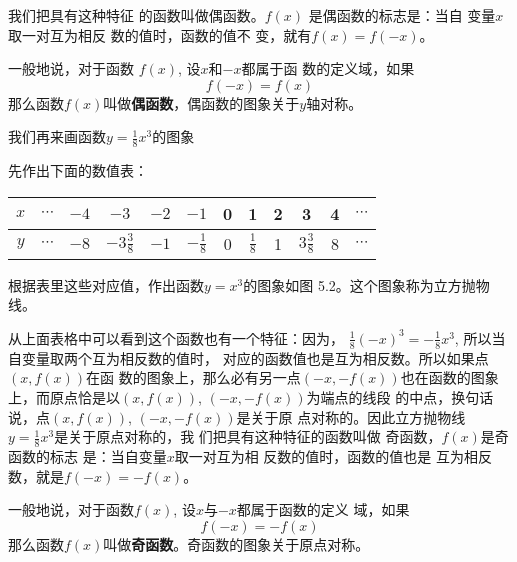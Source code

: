 我们把具有这种特征
的函数叫做偶函数。$f(x)$
是偶函数的标志是：当自
变量$x$取一对互为相反
数的值时，函数的值不
变，就有$f(x)=f(-x)$。

一般地说，对于函数
$f(x)$, 设$x$和$-x$都属于函
数的定义域，如果
\[f(-x)=f(x)\]
那么函数$f(x)$叫做\textbf{偶函数}，偶函数的图象关于$y$轴对称。

我们再来画函数$y=\frac{1}{8}x^3$的图象

先作出下面的数值表：
\begin{center}
\begin{tabular}{c|ccccccccccc}
    \hline
    $x$ &$\cdots$&$-4$&$-3$&$-2$&$-1$&0&1&2&3&4&$\cdots$\\
\hline
$y$ &$\cdots$&$-8$&$-3\tfrac{3}{8}$&$-1$&$-\tfrac{1}{8}$&0&$\tfrac{1}{8}$&1&$3\tfrac{3}{8}$&8&$\cdots$\\
\hline
\end{tabular}
\end{center}

根据表里这些对应值，作出函数$y=x^3$的图象如图
5.2。这个图象称为立方抛物线。
\begin{figure}[htp]
    \centering
{}
    \caption{}
\end{figure}

从上面表格中可以看到这个函数也有一个特征：因为，
$\frac{1}{8}(-x)^3=-\frac{1}{8}x^3$, 所以当自变量取两个互为相反数的值时，
对应的函数值也是互为相反数。所以如果点$(x,f(x))$在函
数的图象上，那么必有另一点$(-x,-f(x))$也在函数的图象
上，而原点恰是以$(x,f(x))$, $(-x,-f(x))$为端点的线段
的中点，换句话说，点$(x,f(x))$, $(-x,-f(x))$是关于原
点对称的。因此立方抛物线
$y=\frac{1}{8}x^3$是关于原点对称的，我
们把具有这种特征的函数叫做
奇函数，$f(x)$是奇函数的标志
是：当自变量$x$取一对互为相
反数的值时，函数的值也是
互为相反数，就是$f(-x)=-f(x)$。

一般地说，对于函数$f(x)$, 设$x$与$-x$都属于函数的定义
域，如果$$f(-x)=-f(x)$$ 那么函数$f(x)$叫做\textbf{奇函数}。奇函数的图象关于原点对称。

